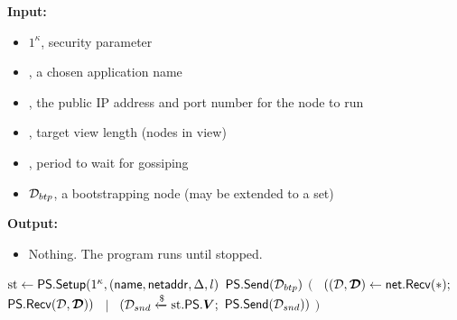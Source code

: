 \begin{algorithm}[H]
\caption{\psrun}
\label{alg:psrun}
\textbf{Input:}
\begin{itemize}
\vspace{-.8em}
\itemsep0em 
    \item $1^\kappa$, security parameter
    \item \appname, a chosen application name
    \item \netaddr, the public IP address and port number for the node to run
    \item \viewlength, target view length (nodes in view)
    \item \gossipperiod, period to wait for gossiping
    \item $\mathcal{D}_{btp}$, a bootstrapping node (may be extended to a set)
\end{itemize}
\textbf{Output:}
\begin{itemize}
\vspace{-.8em}
\itemsep0em 
    \item Nothing. The program runs until stopped.
\end{itemize}
\begin{algorithmic}
\State $\text{st} \gets \mathsf{PS}.\mathsf{Setup}(1^\kappa,(\mathsf{name},\mathsf{netaddr},\Delta,l)$
\State {}
\State $\mathsf{PS}.\mathsf{Send}(\mathcal{D}_{btp})$ 
\State {}
\State $($
\State ~$((\mathcal{D},\boldsymbol{\mathcal{D}}) \gets \mathsf{net}.\mathsf{Recv}(\ast);$ $\mathsf{PS}.\mathsf{Recv}(\mathcal{D}, \boldsymbol{\mathcal{D}}))$
\State ~$|$
%
\State ~$(\mathcal{D}_{snd} \mathrel{\xleftarrow{\$}} \text{st}.\mathsf{PS}.\boldsymbol{V};$ $\mathsf{PS}.\mathsf{Send}(\mathcal{D}_{snd}))$ 
\State $)$
\EndWhile
\end{algorithmic}
\end{algorithm}